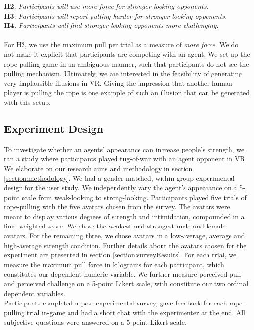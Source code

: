 \textbf{H2}: \textit{Participants will use more force for stronger-looking opponents.}\\

\textbf{H3}: \textit{Participants will report pulling harder for stronger-looking opponents.}\\

\textbf{H4:}\textit{ Participants will find stronger-looking opponents more challenging.}\\
\\
For H2, we use the maximum pull per trial as a measure of \textit{more force}. 
We do not make it explicit that participants are competing with an agent. We set up the rope pulling game in an ambiguous manner, such that participants do not see the pulling mechanism. Ultimately, we are interested in the feasibility of generating very implausible illusions in VR. Giving the impression that another human player is pulling the rope is one example of such an illusion that can be generated with this setup. 
\subsection{Experiment Design}
\label{subsection:ExperimentDesign}
To investigate whether an agents' appearance can increase people's strength, we ran a study where participants played tug-of-war with an agent opponent in VR. We elaborate on our research aims and methodology in section \ref{section:methodology}. We had a gender-matched, within-group experimental design for the user study. We independently vary the agent's appearance on a 5-point scale from weak-looking to strong-looking. Participants played five trials of rope-pulling with the five avatars chosen from the survey. The avatars were meant to display various degrees of strength and intimidation, compounded in a final weighted score. We chose the weakest and strongest male and female avatars. For the remaining three, we chose avatars in a low-average, average and high-average strength condition. Further details about the avatars chosen for the experiment are presented in section \ref{section:surveyResults}. For each trial, we measure the maximum pull force in kilograms for each participant, which constitutes our dependent numeric variable. We further measure perceived pull and perceived challenge on a 5-point Likert scale, with constitute our two ordinal dependent variables.\\
Participants completed a post-experimental survey, gave feedback for each rope-pulling trial in-game and had a short chat with the experimenter at the end. All subjective questions were answered on a 5-point Likert scale.\\


